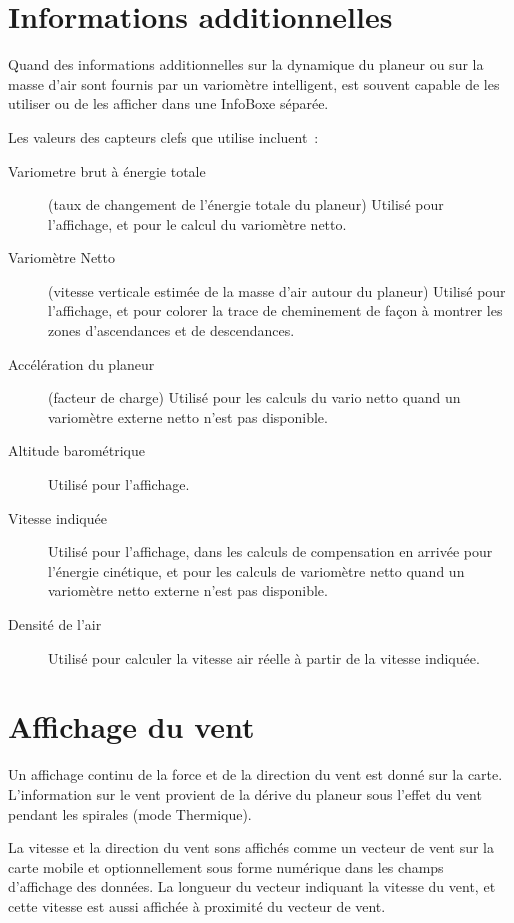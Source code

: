 \section{Informations additionnelles}

Quand des informations additionnelles sur la dynamique du planeur ou sur la masse d'air sont fournis par un variomètre intelligent, \xc{} est souvent capable de les utiliser ou de les afficher dans une InfoBoxe séparée. 

Les valeurs des capteurs clefs que \xc{} utilise incluent~:
\begin{description}
\item[Variometre brut à énergie totale] (taux de changement de l'énergie totale du planeur) Utilisé pour l'affichage, et pour le calcul du variomètre netto.
\item[Variomètre Netto] (vitesse verticale estimée de la masse d'air autour du planeur) Utilisé pour l'affichage, et pour colorer la trace de cheminement de façon à montrer les zones d'ascendances et de descendances.
\item[Accélération du planeur] (facteur de charge) Utilisé pour les calculs du vario netto quand un variomètre externe netto n'est pas disponible.
\item[Altitude barométrique] Utilisé pour l'affichage.
\item[Vitesse indiquée] Utilisé pour l'affichage, dans les calculs de compensation en arrivée pour l'énergie cinétique, et pour les calculs de variomètre netto quand un variomètre netto externe n'est pas disponible.
\item[Densité de l'air] Utilisé pour calculer la vitesse air réelle à partir de la vitesse indiquée.
\end{description}

\section{Affichage du vent}

Un affichage continu de la force et de la direction du vent est donné sur la carte.
L'information sur le vent provient de la dérive du planeur sous l'effet du vent pendant les spirales (mode Thermique).

La vitesse et la direction du vent sons affichés comme un vecteur de vent sur la carte mobile et optionnellement sous forme numérique dans les champs d'affichage des données.
La longueur du vecteur indiquant la vitesse du vent, et cette vitesse est aussi affichée à proximité du vecteur de vent.

